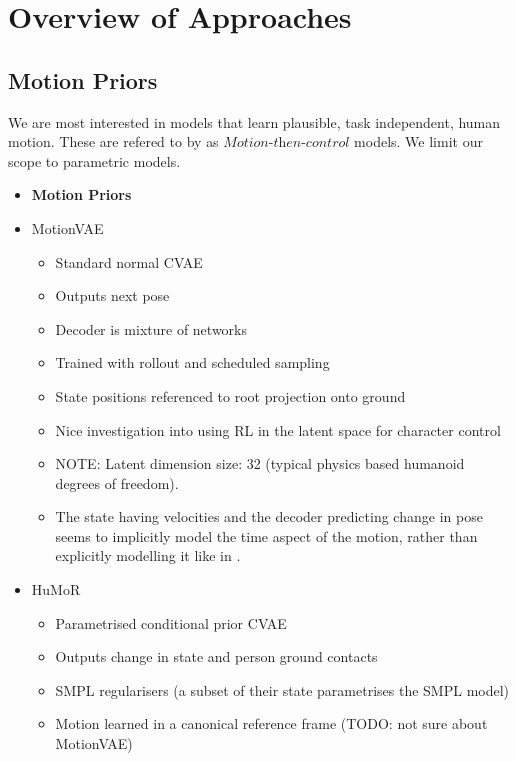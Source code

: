 

\section{Overview of Approaches}

\subsection{Motion Priors}
We are most interested in models that learn plausible, task independent, human motion. These are refered to by \cite{MotionVAE} as $\textit{Motion-then-control}$ models. We limit our scope to parametric models.
\begin{itemize}
    \item \textbf{Motion Priors}
    \item MotionVAE \cite{humor}
    \begin{itemize}
        \item Standard normal CVAE
        \item Outputs next pose
        \item Decoder is mixture of networks
        \item Trained with rollout and scheduled sampling
        \item State positions referenced to root projection onto ground
        \item Nice investigation into using RL in the latent space for character control
        \item NOTE: Latent dimension size: 32 (typical physics based humanoid degrees of freedom).
        \item The state having velocities and the decoder predicting change in pose seems to implicitly model the time aspect of the motion, rather than explicitly modelling it like in \cite{structured4Dlatentspace}.
    \end{itemize}
    \item HuMoR \cite{humor}
    \begin{itemize}
        \item Parametrised conditional prior CVAE
        \item Outputs change in state and person ground contacts
        \item SMPL regularisers (a subset of their state parametrises the SMPL model)
        \item Motion learned in a canonical reference frame (TODO: not sure about MotionVAE)

\end{itemize}
\end{itemize}
